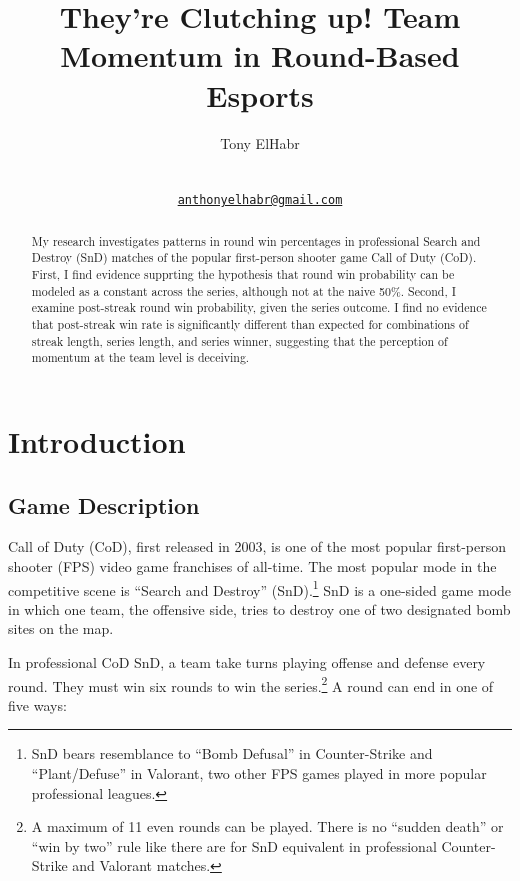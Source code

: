 \documentclass{article}
\title{They're Clutching up! Team Momentum in Round-Based Esports}
\author{
    Tony ElHabr
   \\
     \\
   \\
  \texttt{\href{mailto:anthonyelhabr@gmail.com}{\nolinkurl{anthonyelhabr@gmail.com}}} \\
  }
\begin{document}
\maketitle


\begin{abstract}
My research investigates patterns in round win percentages in
professional Search and Destroy (SnD) matches of the popular
first-person shooter game Call of Duty (CoD). First, I find evidence
supprting the hypothesis that round win probability can be modeled as a
constant across the series, although not at the naive 50\%. Second, I
examine post-streak round win probability, given the series outcome. I
find no evidence that post-streak win rate is significantly different
than expected for combinations of streak length, series length, and
series winner, suggesting that the perception of momentum at the team
level is deceiving.
\end{abstract}


\hypertarget{introduction}{%
\section{Introduction}\label{introduction}}

\hypertarget{game-description}{%
\subsection{Game Description}\label{game-description}}

Call of Duty (CoD), first released in 2003, is one of the most popular
first-person shooter (FPS) video game franchises of all-time. The most
popular mode in the competitive scene is ``Search and Destroy''
(SnD).\footnote{SnD bears resemblance to ``Bomb Defusal'' in
  Counter-Strike and ``Plant/Defuse'' in Valorant, two other FPS games
  played in more popular professional leagues.} SnD is a one-sided game
mode in which one team, the offensive side, tries to destroy one of two
designated bomb sites on the map.

In professional CoD SnD, a team take turns playing offense and defense
every round. They must win six rounds to win the series.\footnote{A
  maximum of 11 even rounds can be played. There is no ``sudden death''
  or ``win by two'' rule like there are for SnD equivalent in
  professional Counter-Strike and Valorant matches.} A round can end in
one of five ways:
\end{document}

